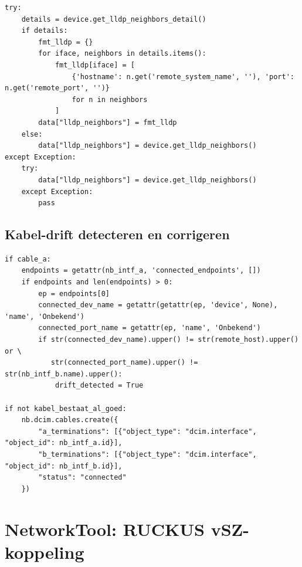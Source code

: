 \begin{listing}[H]
  \caption[NetworkTool: LLDP ophalen en formatteren]{NetworkTool: LLDP ophalen en formatteren met fallback (\S\ref{sec:issues-valkuilen})}
  \label{lst:networktool-lldp-fetch}
  \begin{verbatim}
try:
    details = device.get_lldp_neighbors_detail()
    if details:
        fmt_lldp = {}
        for iface, neighbors in details.items():
            fmt_lldp[iface] = [
                {'hostname': n.get('remote_system_name', ''), 'port': n.get('remote_port', '')}
                for n in neighbors
            ]
        data["lldp_neighbors"] = fmt_lldp
    else:
        data["lldp_neighbors"] = device.get_lldp_neighbors()
except Exception:
    try:
        data["lldp_neighbors"] = device.get_lldp_neighbors()
    except Exception:
        pass
  \end{verbatim}
\end{listing}

\subsection{Kabel-drift detecteren en corrigeren}

\begin{listing}[H]
  \caption[NetworkTool: kabel-drift detecteren en corrigeren]{NetworkTool: kabel-drift detecteren en corrigeren in NetBox (\S\ref{sec:issues-valkuilen})}
  \label{lst:networktool-cable-drift}
  \begin{verbatim}
if cable_a:
    endpoints = getattr(nb_intf_a, 'connected_endpoints', [])
    if endpoints and len(endpoints) > 0:
        ep = endpoints[0]
        connected_dev_name = getattr(getattr(ep, 'device', None), 'name', 'Onbekend')
        connected_port_name = getattr(ep, 'name', 'Onbekend')
        if str(connected_dev_name).upper() != str(remote_host).upper() or \
           str(connected_port_name).upper() != str(nb_intf_b.name).upper():
            drift_detected = True

if not kabel_bestaat_al_goed:
    nb.dcim.cables.create({
        "a_terminations": [{"object_type": "dcim.interface", "object_id": nb_intf_a.id}],
        "b_terminations": [{"object_type": "dcim.interface", "object_id": nb_intf_b.id}],
        "status": "connected"
    })
  \end{verbatim}
\end{listing}

\section{NetworkTool: RUCKUS vSZ-koppeling}
\label{sec:bijlage-vsz}

